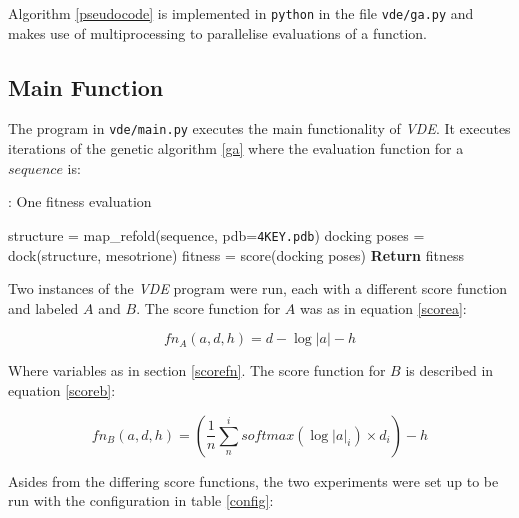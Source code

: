 \documentclass[16pt]{book}
\begin{document}
Algorithm \ref{pseudocode} is implemented in \texttt{python} in the file \texttt{vde/ga.py} and makes use of multiprocessing to parallelise evaluations of a function.

\subsection{Main Function \label{main}}
The program in \texttt{vde/main.py} executes the main functionality of \textit{VDE}.
It executes iterations of the genetic algorithm \ref{ga} where the evaluation function for a $sequence $ is:

\begin{algorithm}
	\caption{\label{fitness}: One fitness evaluation}
	\begin{algorithmic}
		\State structure = map\_refold(sequence, pdb=\texttt{4KEY.pdb}) 
		\State docking poses = dock(structure, mesotrione) 
		\State fitness = score(docking poses) 
		\State \textbf{Return} fitness
		\EndProcedure
	\end{algorithmic}
\end{algorithm}

Two instances of the \textit{VDE} program were run, each with a different score function and labeled $A$ and $B$.
The score function for $A$ was as in equation \ref{scorea}:

\begin{equation}\label{scorea}
	fn_A(a, d, h) = d - \log{|a|} - h
\end{equation}

Where variables as in section \ref{scorefn}.
The score function for $B$ is described in equation \ref{scoreb}:

\begin{equation}\label{scoreb}
	fn_B(a, d, h) = (\frac{1}{n} \sum_{n}^{i} softmax(\log{|a|}_i)\times d_i) -  h
\end{equation}

Asides from the differing score functions, the two experiments were set up to be run with the configuration in table \ref{config}:
\end{document}

